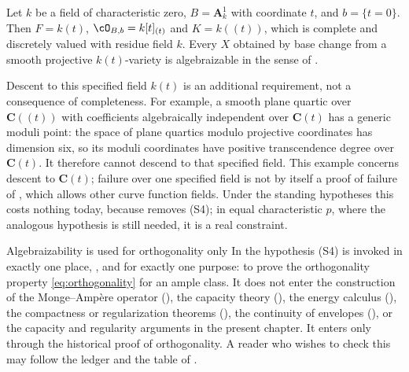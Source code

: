 \begin{example}
\label{ex:ch29-algebraizability-instance}
Let $k$ be a field of characteristic zero, $B=\mathbf A^1_k$ with
coordinate $t$, and $b=\{t=0\}$.  Then
$F=k(t)$, $\cO_{B,b}=k[t]_{(t)}$ and
$K=k(\!(t)\!)$, which is complete and discretely valued with residue field
$k$.  Every $X$ obtained by base change from a smooth projective
$k(t)$-variety is algebraizable in the sense of
.

Descent to this specified field $k(t)$ is an additional requirement,
not a consequence of completeness.  For example, a smooth plane quartic
over $\mathbf C(\!(t)\!)$ with coefficients algebraically independent
over $\mathbf C(t)$ has a generic moduli point: the space of plane
quartics modulo projective coordinates has dimension six, so its moduli
coordinates have positive transcendence degree over $\mathbf C(t)$.
It therefore cannot descend to that specified field.  This example
concerns descent to $\mathbf C(t)$; failure over one specified field is
not by itself a proof of failure of , which
allows other curve function fields.  Under the standing hypotheses this costs
nothing today, because  removes
\textup{(S4)}; in equal characteristic $p$, where the analogous
hypothesis  is still needed, it is a real
constraint.
\end{example}

\begin{warning}{Algebraizability is used for orthogonality only}
\label{warn:ch29-algebraizability-scope}
In \cite{BFJ15} the hypothesis \textup{(S4)} is invoked in exactly one
place, \cite[Appendix~A]{BFJ15}, and for exactly one purpose: to prove the
orthogonality property \eqref{eq:orthogonality} for an ample class.  It does
not enter the construction of the Monge--Amp\`ere operator
(), the capacity theory (), the
energy calculus (), the compactness or regularization
theorems (), the continuity of envelopes
(), or the capacity and regularity arguments in the present chapter.
It enters only through the historical proof of orthogonality.  A
reader who wishes to check this may follow the ledger
 and the table of
.
\end{warning}

